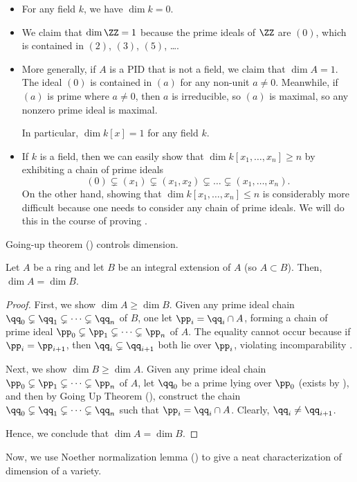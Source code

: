 \begin{example}
    \label{ex:dimensions}
    \begin{itemize}
    \item For any field $k$, we have $\dim k=0$.
    \item We claim that $\dim \ZZ=1$ because the prime ideals
    of $\ZZ$ are $(0)$, which is contained in 
    $(2)$, $(3)$, $(5)$, \dots.
    \item More generally, if $A$ is a PID that is not a field, 
    we claim that $\dim A=1$. The ideal $(0)$ is contained 
    in $(a)$ for any non-unit $a\neq 0$.
    Meanwhile, if $(a)$ is prime where $a\neq 0$, 
    then $a$ is irreducible,
    so $(a)$ is maximal, so any nonzero prime ideal is maximal.

    In particular, $\dim k[x]=1$ for any field $k$.
    \item If $k$ is a field, then we can easily show that 
    $\dim k[x_1,\dots,x_n]\geq n$ by exhibiting a chain of 
    prime ideals
    $$(0)\subsetneq (x_1) \subsetneq (x_1,x_2) \subsetneq
    \dots\subsetneq (x_1,\dots,x_n).$$
    On the other hand, showing that $\dim k[x_1,\dots,x_n]\leq n$
    is considerably more difficult because one needs to 
    consider any chain of prime ideals. We will do this in 
    the course of proving .
    \end{itemize}
\end{example}

Going-up theorem () controls dimension.
\begin{theorem}
    \label{thm:dim_integral}
    Let $A$ be a ring and let $B$ be an integral extension
    of $A$ (so $A\subset B$). 
    Then, $\dim A=\dim B$.
\end{theorem}
\begin{proof}
    First, we show $\dim A\geq \dim B$.
    Given any prime ideal chain $\qq_0\subsetneq \qq_1 
    \subsetneq \dots\subsetneq \qq_n$ of $B$,
    one let $\pp_i = \qq_i\cap A$, forming a chain of 
    prime ideal $\pp_0\subsetneq \pp_1 
    \subsetneq \dots\subsetneq \pp_n$ of $A$.
    The equality cannot occur because if $\pp_i=\pp_{i+1}$,
    then $\qq_i\subsetneq \qq_{i+1}$ both lie over $\pp_i$,
    violating incomparability .

    Next, we show $\dim B\geq \dim A$.
    Given any prime ideal chain $\pp_0\subsetneq \pp_1 
    \subsetneq \dots\subsetneq \pp_n$ of $A$,
    let $\qq_0$ be a prime lying over $\pp_0$
    (exists by ),
    and then by Going Up Theorem (),
    construct the chain $\qq_0\subsetneq \qq_1\subsetneq \dots 
    \subsetneq\qq_n$ such that $\pp_i=\qq_i\cap A$.
    Clearly, $\qq_i\neq \qq_{i+1}$.

    Hence, we conclude that $\dim A=\dim B$.
\end{proof}
Now, we use Noether normalization lemma 
() to give a neat 
characterization of dimension of a variety.

